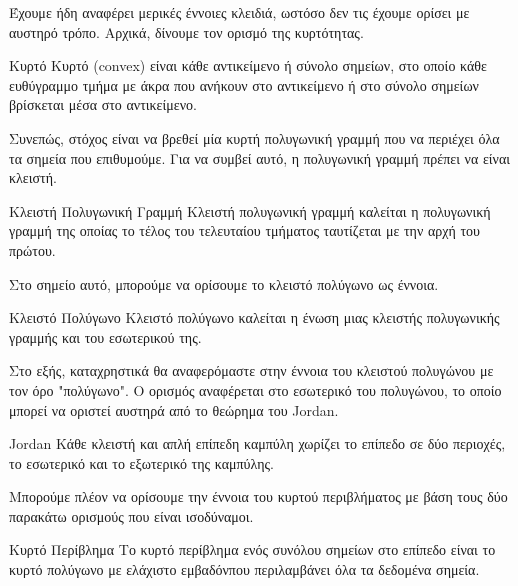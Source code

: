 \documentclass[oneside,12pt]{book}
\theoremstyle{definition}
\begin{document}
Έχουμε ήδη αναφέρει μερικές έννοιες κλειδιά, ωστόσο δεν τις έχουμε ορίσει με αυστηρό τρόπο. Αρχικά, δίνουμε τον ορισμό της κυρτότητας. \\

\begin{mydefinition}{Κυρτό}{}
	Κυρτό (convex) είναι κάθε αντικείμενο ή σύνολο σημείων, στο οποίο κάθε ευθύγραμμο τμήμα με άκρα που ανήκουν στο αντικείμενο ή στο σύνολο σημείων βρίσκεται μέσα στο αντικείμενο.
\end{mydefinition}

Συνεπώς, στόχος είναι να βρεθεί μία κυρτή πολυγωνική γραμμή που να περιέχει όλα τα σημεία που επιθυμούμε. Για να συμβεί αυτό, η πολυγωνική γραμμή πρέπει να είναι κλειστή. \\

\begin{mydefinition}{Κλειστή Πολυγωνική Γραμμή}{}
	Κλειστή πολυγωνική γραμμή καλείται η πολυγωνική γραμμή της οποίας το τέλος του τελευταίου τμήματος ταυτίζεται με την αρχή του πρώτου.
\end{mydefinition}

Στο σημείο αυτό, μπορούμε να ορίσουμε το κλειστό πολύγωνο ως έννοια. \\

\begin{mydefinition}{Κλειστό Πολύγωνο}{}
	Κλειστό πολύγωνο καλείται η ένωση μιας κλειστής πολυγωνικής γραμμής και του εσωτερικού της.
\end{mydefinition}

Στο εξής, καταχρηστικά θα αναφερόμαστε στην έννοια του κλειστού πολυγώνου με τον όρο "πολύγωνο". Ο ορισμός αναφέρεται στο εσωτερικό του πολυγώνου, το οποίο μπορεί να οριστεί αυστηρά από το θεώρημα του Jordan. \\

\begin{mytheorem}{Jordan}{}
	Κάθε κλειστή και απλή επίπεδη καμπύλη χωρίζει το επίπεδο σε δύο περιοχές, το εσωτερικό και το εξωτερικό της καμπύλης.
\end{mytheorem}

Μπορούμε πλέον να ορίσουμε την έννοια του κυρτού περιβλήματος με βάση τους δύο παρακάτω ορισμούς που είναι ισοδύναμοι. \\

\begin{mydefinition}{Κυρτό Περίβλημα}{}
	Το κυρτό περίβλημα ενός συνόλου σημείων στο επίπεδο είναι το κυρτό πολύγωνο με ελάχιστο εμβαδόνπου περιλαμβάνει όλα τα δεδομένα σημεία.
\end{mydefinition}
\end{document}

